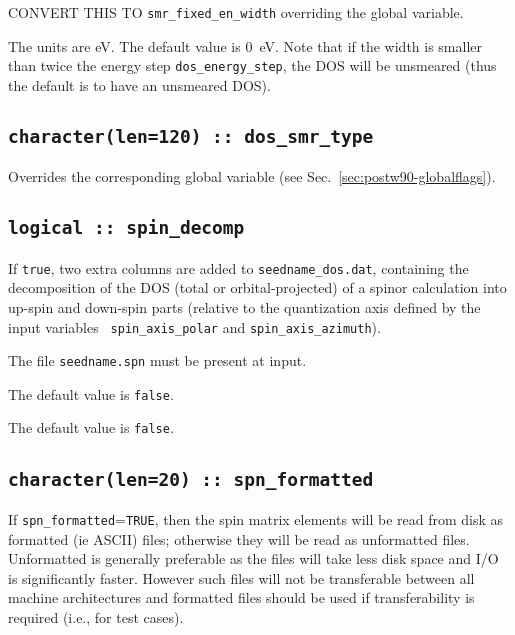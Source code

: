 {\color{red} CONVERT THIS TO {\tt smr\_fixed\_en\_width} overriding
  the global variable.} 

The units are eV. The default value is 0~eV. Note that if the width is
smaller than twice the energy step {\tt dos\_energy\_step}, the DOS
will be unsmeared (thus the default is to have an unsmeared DOS).


\subsection[dos\_smr\_type]{\tt  character(len=120) :: dos\_smr\_type}
Overrides the corresponding global variable (see Sec.~\ref{sec:postw90-globalflags}).

\subsection[spin\_decomp]{\tt logical :: spin\_decomp}
If {\tt true}, two extra columns are added to {\tt seedname\_dos.dat},
containing the decomposition of the DOS (total or orbital-projected)
of a spinor calculation into up-spin and down-spin parts (relative to
the quantization axis defined by the input variables {\tt
  spin\_axis\_polar} and {\tt spin\_axis\_azimuth}). 

The file {\tt seedname.spn} must be present at input.

The default value is \verb#false#.


The default value is \verb#false#.


\subsection[spn\_formatted]{\tt character(len=20) :: spn\_formatted}

If \verb#spn_formatted#=\verb#TRUE#, then the spin matrix elements will be
read from disk as formatted (ie ASCII) files; otherwise they will be
read as unformatted files. Unformatted is generally preferable as the
files will take less disk space and I/O is significantly
faster. However such files will not be transferable between all
machine architectures and formatted files should be used if
transferability is required (i.e., for test cases).

